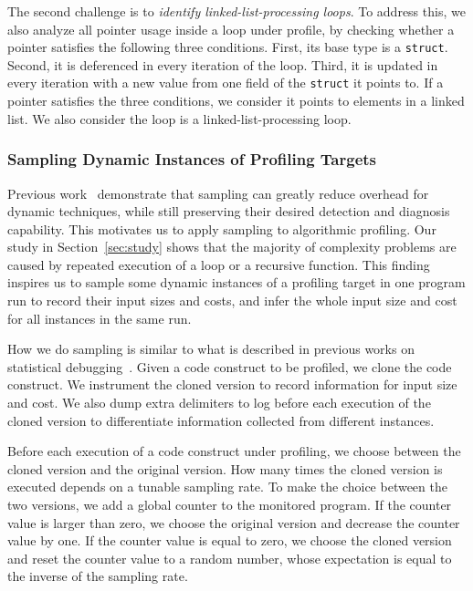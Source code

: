 {{%
The second challenge is to \emph{identify linked-list-processing loops}.
To address this, we also analyze all pointer usage inside a loop under profile, 
by checking whether a pointer satisfies the following three conditions.
First, its base type is a \texttt{struct}.
Second, it is deferenced in every iteration of the loop.
Third, it is updated in every iteration with a new value 
from one field of the \texttt{struct} it points to.
If a pointer satisfies the three conditions, 
we consider it points to elements in a linked list.
We also consider the loop is a linked-list-processing loop. 



\subsubsection{Sampling Dynamic Instances of Profiling Targets}


Previous work~\cite{liblit03,liblit05,CCI,SongOOPSLA2014,ldoctor}
demonstrate that sampling can greatly 
reduce overhead for dynamic techniques,
while still preserving their desired 
detection and diagnosis capability. 
This motivates us to apply sampling to algorithmic profiling. 
Our study in Section~\ref{sec:study} shows that 
the majority of complexity problems are caused by repeated execution of a loop
or a recursive function. 
This finding inspires us to sample some dynamic instances of 
a profiling target in one program run to 
record their input sizes and costs,
and infer the whole input size and cost for all instances in the same run.


How we do sampling is similar to what is described in previous works 
on statistical debugging~\cite{liblit03,liblit05,CCI,SongOOPSLA2014,ldoctor}.
Given a code construct to be profiled, 
we clone the code construct.
We instrument the cloned version to record information for input size and cost.
We also dump extra delimiters to log before each 
execution of the cloned version
to differentiate information collected from different instances. 


Before each execution of a code construct under profiling, 
we choose between the cloned version and the original version. 
How many times the cloned version is executed 
depends on a tunable sampling rate. 
To make the choice between the two versions,
we add a global counter to the monitored program. 
If the counter value is larger than zero, 
we choose the original version and decrease the counter value by one.
If the counter value is equal to zero,
we choose the cloned version and reset the counter value to 
a random number, 
whose expectation is 
equal to the inverse of the sampling rate.  

}}
